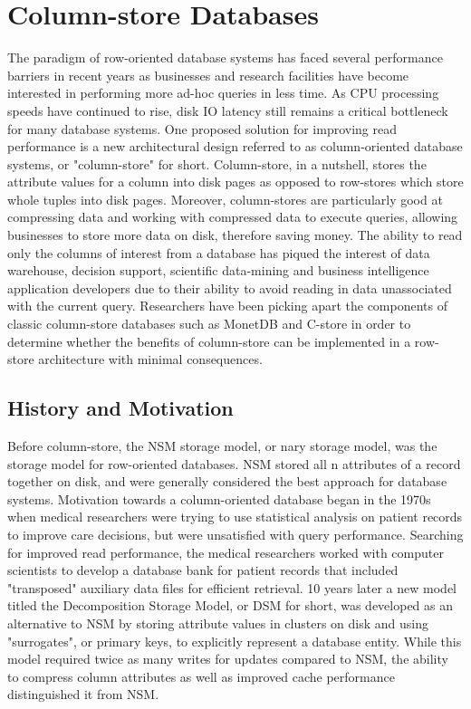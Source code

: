 \documentclass[11pt,a4paper]{report}
\begin{document}
\chapter{Column-store Databases}
The paradigm of row-oriented database systems has faced several performance barriers in recent years as businesses and research facilities have become interested in performing more ad-hoc queries in less time. As CPU processing speeds have continued to rise, disk IO latency still remains a critical bottleneck for many database systems.\cite{stonebraker2005c} One proposed solution for improving read performance is a new architectural design referred to as column-oriented database systems, or "column-store" for short. Column-store, in a nutshell, stores the attribute values for a column into disk pages as opposed to row-stores which store whole tuples into disk pages. Moreover, column-stores are particularly good at compressing data and working with compressed data to execute queries, allowing businesses to store more data on disk, therefore saving money.\cite{abadi2006integrating} The ability to read only the columns of interest from a database has piqued the interest of data warehouse, decision support, scientific data-mining and business intelligence application developers due to their ability to avoid reading in data unassociated with the current query.\cite{harizopoulos2006performance, abadi2009column} Researchers have been picking apart the components of classic column-store databases such as MonetDB and C-store in order to determine whether the benefits of column-store can be implemented in a row-store architecture with minimal consequences.\cite{harizopoulos2006performance, bruno2009teaching,holloway2008read}

\section{History and Motivation}
Before column-store, the NSM storage model, or nary storage model, was the storage model for row-oriented databases. NSM stored all n attributes of a record together on disk, and were generally considered the best approach for database systems.\cite{copeland1985decomposition} Motivation towards a column-oriented database began in the 1970s when medical researchers were trying to use statistical analysis on patient records to improve care decisions, but were unsatisfied with query performance.\cite{weyl1975modular}  Searching for improved read performance, the medical researchers worked with computer scientists to develop a database bank for patient records that included "transposed" auxiliary data files for efficient retrieval. \cite{weyl1975modular} 10 years later a new model titled the Decomposition Storage Model, or DSM for short, was developed as an alternative to NSM by storing attribute values in clusters on disk and using "surrogates", or primary keys, to explicitly represent a database entity.\cite{copeland1985decomposition} While this model required twice as many writes for updates compared to NSM, the ability to compress column attributes as well as improved cache performance distinguished it from NSM.\cite{copeland1985decomposition} 
\end{document}
